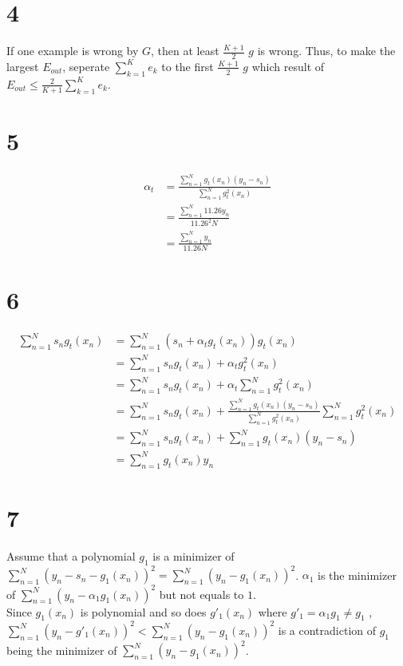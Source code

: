 \documentclass[12pt]{article}
\begin{document}
\section*{4}
If one example is wrong by $G$, then at least $\frac{K+1}{2}$ $g$ is wrong. Thus, to make the largest $E_{out}$, seperate $\sum_{k=1}^K e_k$ to the first $\frac{K+1}{2}$ $g$
which result of $E_{out} \leq \frac{2}{K+1} \sum_{k=1}^K e_k$.

\section*{5}
\begin{equation*}
\begin{split}
    \alpha_t &= \frac{\sum_{n=1}^N g_t(x_n)(y_n - s_n)}{\sum_{n=1}^N g_t^2(x_n)} \\
    &= \frac{\sum_{n=1}^N 11.26y_n}{11.26^2 N} \\
    &= \frac{\sum_{n=1}^N y_n}{11.26N}
\end{split}
\end{equation*}
\section*{6}
\begin{equation*}
\begin{split}
    \sum_{n=1}^{N} s_n g_t(x_n) &= \sum_{n=1}^{N} (s_n + \alpha_t g_t(x_n)) g_t(x_n) \\
    &= \sum_{n=1}^{N} s_n  g_t(x_n) + \alpha_t g_t^2(x_n) \\
    &= \sum_{n=1}^{N} s_n  g_t(x_n) + \alpha_t \sum_{n=1}^{N} g_t^2(x_n) \\
    &= \sum_{n=1}^{N} s_n  g_t(x_n) + \frac{\sum_{n=1}^N g_t(x_n)(y_n - s_n)}{\sum_{n=1}^N g_t^2(x_n)} \sum_{n=1}^{N} g_t^2(x_n) \\
    &= \sum_{n=1}^{N} s_n  g_t(x_n) + \sum_{n=1}^N g_t(x_n)(y_n - s_n) \\
    &= \sum_{n=1}^N g_t(x_n)y_n
\end{split}
\end{equation*}

\section*{7}
Assume that a polynomial $g_1$ is a minimizer of $\sum_{n=1}^{N}(y_n -s_n - g_1(x_n))^2 = \sum_{n=1}^{N}(y_n - g_1(x_n))^2$.
$\alpha_1$ is the minimizer of $\sum_{n=1}^{N}(y_n - \alpha_1g_1(x_n))^2$ but not equals to $1$.  \\
Since $g_1(x_n)$ is polynomial and so does $g'_1(x_n)$ where $g'_1 = \alpha_1g_1 \neq g_1$ , 
$\sum_{n=1}^{N}(y_n - g'_1(x_n))^2 < \sum_{n=1}^{N}(y_n - g_1(x_n))^2$ is a contradiction of $g_1$ being the minimizer of $\sum_{n=1}^{N}(y_n - g_1(x_n))^2$.
\end{document}
